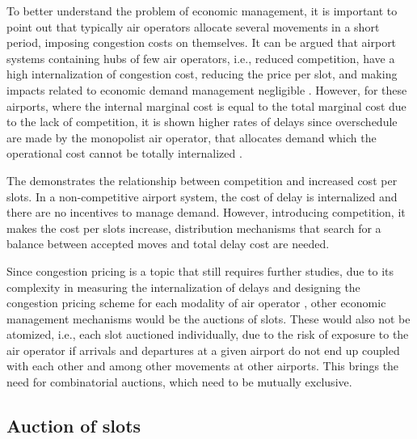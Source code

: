 %

To better understand the problem of economic management, it is important to point out that typically air operators allocate several movements in a short period, imposing congestion costs on themselves. It can be argued that airport systems containing hubs of few air operators, i.e., reduced competition, have a high internalization of congestion cost, reducing the price per slot, and making impacts related to economic demand management negligible \cite{ball2006auctions, gillen2016airport}. However, for these airports, where the internal marginal cost is equal to the total marginal cost due to the lack of competition, it is shown higher rates of delays since overschedule are made by the monopolist air operator, that allocates demand which the operational cost cannot be totally internalized \cite{ball2006auctions}.

The  demonstrates the relationship between competition and increased cost per slots. In a non-competitive airport system, the cost of delay is internalized and there are no incentives to manage demand. However, introducing competition, it makes the cost per slots increase, distribution mechanisms that search for a balance between accepted moves and total delay cost are needed.

%

Since congestion pricing is a topic that still requires further studies, due to its complexity in measuring the internalization of delays and designing the congestion pricing scheme for each modality of air operator \cite{gillen2016airport}, other economic management mechanisms would be the auctions of slots. These would also not be atomized, i.e., each slot auctioned individually, due to the risk of exposure to the air operator if arrivals and departures at a given airport do not end up coupled with each other and among other movements at other airports. This brings the need for combinatorial auctions, which need to be mutually exclusive.

\subsection{Auction of slots}

